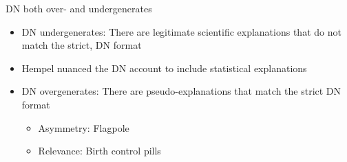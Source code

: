 \documentclass[fleqn]{beamer}
\begin{document}
\begin{frame}{DN both over- and undergenerates}

  \begin{itemize}
  \item DN undergenerates: There are legitimate scientific
    explanations that do not match the strict, DN format
  \item Hempel nuanced the DN account to include statistical
    explanations
  \item DN overgenerates: There are pseudo-explanations that match the
    strict DN format
    \begin{itemize}
    \item Asymmetry: Flagpole
    \item Relevance: Birth control pills
    \end{itemize}
  \end{itemize}

\end{frame}
\end{document}
